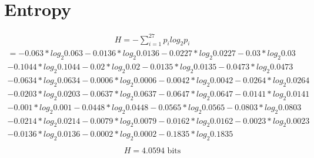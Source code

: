 \documentclass{article}
\begin{document}
    \section{Entropy}
    \begin{align*}
        H = -\sum_{i = 1}^{27} p_i log_2 p_i
    \end{align*}
    \begin{multline*}
          = - 0.063 * log_2 0.063 - 0.0136 * log_2 0.0136 - 0.0227 * log_2 0.0227 - 0.03 * log_2 0.03 \\
            - 0.1044 * log_2 0.1044 - 0.02 * log_2 0.02 - 0.0135 * log_2 0.0135 - 0.0473 * log_2 0.0473 \\
            - 0.0634 * log_2 0.0634 - 0.0006 * log_2 0.0006 - 0.0042 * log_2 0.0042 - 0.0264 * log_2 0.0264 \\
            - 0.0203 * log_2 0.0203 - 0.0637 * log_2 0.0637 - 0.0647 * log_2 0.0647 - 0.0141 * log_2 0.0141 \\
            - 0.001 * log_2 0.001 - 0.0448 * log_2 0.0448 - 0.0565 * log_2 0.0565 - 0.0803 * log_2 0.0803 \\
            - 0.0214 * log_2 0.0214 - 0.0079 * log_2 0.0079 - 0.0162 * log_2 0.0162 - 0.0023 * log_2 0.0023 \\
            - 0.0136 * log_2 0.0136 - 0.0002 * log_2 0.0002 - 0.1835 * log_2 0.1835 \\
    \end{multline*}
    \begin{align*}
        H = 4.0594 \text{ bits}
    \end{align*}
\end{document}
